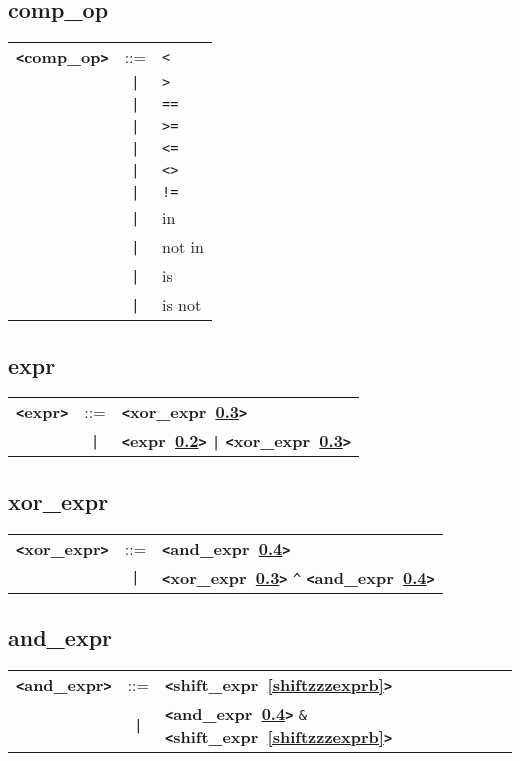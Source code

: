 \documentclass[12pt]{article}
\begin{document}
\subsection{comp\_op}
\label{compzzzopb}
\begin{tabular}{lcl}
{\bf \verb+<+comp\_op\verb+>+} & ::=  & \verb|<| \\
 & \verb+|+  & \verb|>| \\
 & \verb+|+  & \verb|==| \\
 & \verb+|+  & \verb|>=| \\
 & \verb+|+  & \verb|<=| \\
 & \verb+|+  & \verb|<>| \\
 & \verb+|+  & \verb|!=| \\
 & \verb+|+  & in \\
 & \verb+|+  & not in \\
 & \verb+|+  & is \\
 & \verb+|+  & is not \\
\end{tabular}

\subsection{expr}
\label{exprb}
\begin{tabular}{lcl}
{\bf \verb+<+expr\verb+>+} & ::=  & {\bf \verb+<+xor\_expr~\ref{xorzzzexprb}\verb+>+}  \\
 & \verb+|+  & {\bf \verb+<+expr~\ref{exprb}\verb+>+}  \verb+|+ {\bf \verb+<+xor\_expr~\ref{xorzzzexprb}\verb+>+}  \\
\end{tabular}

\subsection{xor\_expr}
\label{xorzzzexprb}
\begin{tabular}{lcl}
{\bf \verb+<+xor\_expr\verb+>+} & ::=  & {\bf \verb+<+and\_expr~\ref{andzzzexprb}\verb+>+}  \\
 & \verb+|+  & {\bf \verb+<+xor\_expr~\ref{xorzzzexprb}\verb+>+}  \verb|^| {\bf \verb+<+and\_expr~\ref{andzzzexprb}\verb+>+}  \\
\end{tabular}

\subsection{and\_expr}
\label{andzzzexprb}
\begin{tabular}{lcl}
{\bf \verb+<+and\_expr\verb+>+} & ::=  & {\bf \verb+<+shift\_expr~\ref{shiftzzzexprb}\verb+>+}  \\
 & \verb+|+  & {\bf \verb+<+and\_expr~\ref{andzzzexprb}\verb+>+}  \verb|&| {\bf \verb+<+shift\_expr~\ref{shiftzzzexprb}\verb+>+}  \\
\end{tabular}
\end{document}
